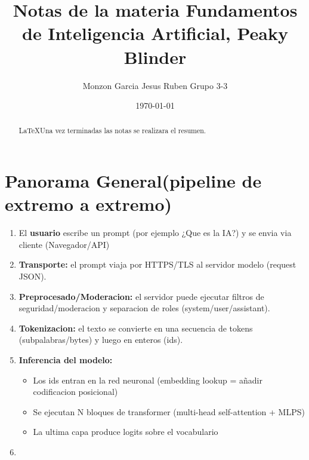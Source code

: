 \documentclass{article}
\title{Notas de la materia Fundamentos de Inteligencia Artificial, Peaky Blinder}
\author{Monzon Garcia Jesus Ruben Grupo 3-3}
\date{ \today }
\begin{document}
\sloppy
\maketitle
\begin{abstract}
    \noindent \LaTeX  Una vez terminadas las notas se realizara el resumen.
\end{abstract}

\section*{Panorama General(pipeline de extremo a extremo)}

\begin{enumerate}
    \item El \textbf{usuario} escribe un prompt (por ejemplo ¿Que es la IA?) y se envia via cliente (Navegador/API)
    \item \textbf{Transporte:} el prompt viaja por HTTPS/TLS al servidor modelo (request JSON).
    \item \textbf{Preprocesado/Moderacion:} el servidor puede ejecutar filtros de seguridad/moderacion y separacion de roles (system/user/assistant).
    \item \textbf{Tokenizacion:} el texto se convierte en una secuencia de tokens (subpalabras/bytes) y luego en enteros (ids).
    \item \textbf{Inferencia del modelo:}
        \begin{itemize}
            \item Los ids entran en la red neuronal (embedding lookup = añadir codificacion posicional)
            \item Se ejecutan N bloques de transformer (multi-head self-attention + MLPS)
            \item La ultima capa produce logits sobre el vocabulario
        \end{itemize}
    \item 
        
\end{enumerate}



\printbibliography
\end{document}

